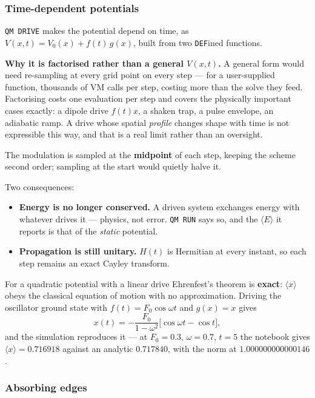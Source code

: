 \documentclass[11pt]{article}
\newcommand{\kw}[1]{\texttt{\uppercase{#1}}}
\newcommand{\code}[1]{\texttt{#1}}
\begin{document}
\subsubsection*{Time-dependent potentials}

\code{QM DRIVE} makes the potential depend on time, as
$V(x,t) = V_0(x) + f(t)\,g(x)$, built from two \kw{def}ined functions.

\textbf{Why it is factorised rather than a general $V(x,t)$.} A general
form would need re-sampling at every grid point on every step --- for a
user-supplied function, thousands of VM calls per step, costing more
than the solve they feed. Factorising costs one evaluation per step and
covers the physically important cases exactly: a dipole drive $f(t)x$, a
shaken trap, a pulse envelope, an adiabatic ramp. A drive whose spatial
\emph{profile} changes shape with time is not expressible this way, and
that is a real limit rather than an oversight.

The modulation is sampled at the \textbf{midpoint} of each step, keeping
the scheme second order; sampling at the start would quietly halve it.

Two consequences:

\begin{itemize}
\item \textbf{Energy is no longer conserved.} A driven system exchanges
      energy with whatever drives it --- physics, not error. \code{QM RUN}
      says so, and the $\langle E\rangle$ it reports is that of the
      \emph{static} potential.
\item \textbf{Propagation is still unitary.} $H(t)$ is Hermitian at every
      instant, so each step remains an exact Cayley transform.
\end{itemize}

For a quadratic potential with a linear drive Ehrenfest's theorem is
\textbf{exact}: $\langle x\rangle$ obeys the classical equation of motion
with no approximation. Driving the oscillator ground state with
$f(t)=F_0\cos\omega t$ and $g(x)=x$ gives
\[
  x(t) = -\frac{F_0}{1-\omega^2}\bigl[\cos\omega t - \cos t\bigr],
\]
and the simulation reproduces it --- at $F_0=0.3$, $\omega=0.7$, $t=5$
the notebook gives $\langle x\rangle = 0.716918$ against an analytic
$0.717840$, with the norm at $1.000000000000146$.

\subsubsection*{Absorbing edges}
\end{document}
